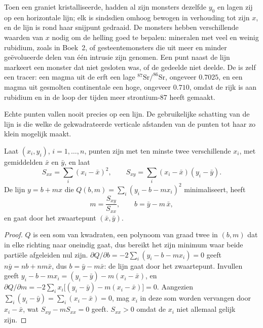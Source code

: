 Toen een graniet kristalliseerde, hadden al zijn monsters dezelfde $y_0$ en lagen zij op een horizontale lijn; elk is sindsdien omhoog bewogen in verhouding tot zijn $x$, en de lijn is rond haar snijpunt gedraaid. De monsters hebben verschillende waarden van $x$ nodig om de helling goed te bepalen: mineralen met veel en weinig rubidium, zoals in Boek~2, of gesteentemonsters die uit meer en minder geëvolueerde delen van één intrusie zijn genomen. Een punt naast de lijn markeert een monster dat niet gesloten was, of de gedeelde  niet deelde. De  is zelf een tracer: een magma uit de  erft een lage $^{87}\mathrm{Sr}/^{86}\mathrm{Sr}$, ongeveer $0.7025$, en een magma uit gesmolten continentale  een hoge, ongeveer $0.710$, omdat de  rijk is aan rubidium en in de loop der tijden meer strontium-87 heeft gemaakt.

Echte punten vallen nooit precies op een lijn. De gebruikelijke schatting van de lijn is die welke de gekwadrateerde verticale afstanden van de punten tot haar zo klein mogelijk maakt.

\begin{proposition}\label{prop:b1:radiometric-methods:lsq}
Laat $(x_i, y_i)$, $i = 1, \dots, n$, punten zijn met ten minste twee verschillende $x_i$,
met gemiddelden $\bar x$ en $\bar y$, en laat
\[
  S_{xx} = \sum_i (x_i - \bar x)^2, \qquad S_{xy} = \sum_i (x_i - \bar x)(y_i - \bar y).
\]
De lijn $y = b + m x$ die $Q(b, m) = \sum_i (y_i - b - m x_i)^2$ minimaliseert, heeft
\[
  m = \frac{S_{xy}}{S_{xx}}, \qquad b = \bar y - m\,\bar x ,
\]
en gaat door het zwaartepunt $(\bar x, \bar y)$.
\end{proposition}

\begin{proof}
$Q$ is een som van kwadraten, een polynoom van graad twee in $(b, m)$ dat in elke richting naar oneindig gaat, dus bereikt het zijn minimum waar beide partiële afgeleiden nul zijn. $\partial Q/\partial b = -2 \sum_i (y_i - b - m x_i) = 0$ geeft $n\bar y = n b + n m \bar x$, dus $b = \bar y - m \bar x$: de lijn gaat door het zwaartepunt. Invullen geeft $y_i - b - m x_i = (y_i - \bar y) - m(x_i -
\bar x)$, en $\partial Q/\partial m = -2 \sum_i x_i \bigl[(y_i - \bar y) - m(x_i
- \bar x)\bigr] = 0$. Aangezien $\sum_i (y_i - \bar y) = \sum_i (x_i - \bar x) = 0$, mag $x_i$
in deze som worden vervangen door $x_i - \bar x$, wat $S_{xy} - m S_{xx} = 0$ geeft.
$S_{xx} > 0$ omdat de $x_i$ niet allemaal gelijk zijn.
\end{proof}

